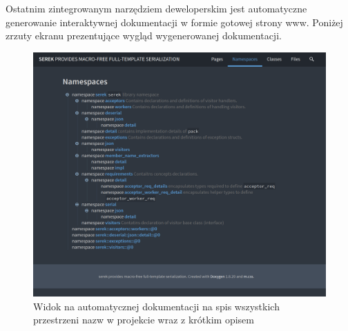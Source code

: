 \documentclass[12pt]{article}
\newcommand{\n}{\newline}
\begin{document}
{{{				Ostatnim zintegrowanym narzędziem deweloperskim jest automatyczne generowanie interaktywnej dokumentacji w formie gotowej strony www. Poniżej zrzuty
				ekranu prezentujące wygląd wygenerowanej dokumentacji.\n

				\begin{figure}[H]
					\centering
					\includegraphics[width=15cm,keepaspectratio=true]{./img/documentation_part_1.png}
					\caption*{Widok na automatycznej dokumentacji na spis wszystkich przestrzeni nazw w projekcie wraz z krótkim opisem}
					\medskip
				\end{figure}

}}}
\end{document}

